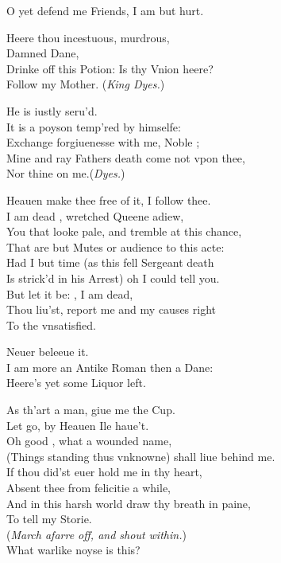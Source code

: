 \documentclass[a5paper,DIV=calc,11pt]{scrbook}
\begin{document}
\begin{drama*}
    \kingspeaks O yet defend me Friends, I am but hurt.
    
    \hamspeaks Heere thou incestuous, murdrous,\\
    Damned Dane,\\
    Drinke off this Potion: Is thy Vnion heere?\\
    Follow my Mother. \hfill(\textit{King Dyes.})
    
    \laerspeaks He is iustly seru'd.\\
    It is a poyson temp'red by himselfe:\\
    Exchange forgiuenesse with me, Noble \ham;\\
    Mine and ray Fathers death come not vpon thee,\\
    Nor thine on me.\hfill(\textit{Dyes.})
    
    \hamspeaks Heauen make thee free of it, I follow thee.\\
    I am dead \hor, wretched Queene adiew,\\
    You that looke pale, and tremble at this chance,\\
    That are but Mutes or audience to this acte:\\
    Had I but time (as this fell Sergeant death\\
    Is strick'd in his Arrest) oh I could tell you.\\
    But let it be: \hor, I am dead,\\
    Thou liu'st, report me and my causes right\\
    To the vnsatisfied.
    
    \horspeaks Neuer beleeue it.\\
    I am more an Antike Roman then a Dane:\\
    Heere's yet some Liquor left.
    
    \hamspeaks As th'art a man, giue me the Cup.\\
    Let go, by Heauen Ile haue't.\\
    Oh good \hor, what a wounded name,\\
    (Things standing thus vnknowne) shall liue behind me.\\
    If thou did'st euer hold me in thy heart,\\
    Absent thee from felicitie a while,\\
    And in this harsh world draw thy breath in paine,\\
    To tell my Storie.\\
    (\textit{March afarre off, and shout within.})\\
    What warlike noyse is this?
    

\end{drama*}
\end{document}
